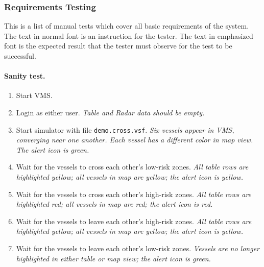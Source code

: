 \documentclass{article}
\begin{document}
\subsubsection{Requirements Testing}


This is a list of manual tests which cover all basic requirements of the system. The text in normal font is an instruction for the tester. The text in emphasized font is the expected result that the tester must observe for the test to be successful.

\paragraph{Sanity test.}

\begin{enumerate}
\item Start VMS.
\item Login as either user. \emph{Table and Radar data should be empty.}
\item Start simulator with file \verb|demo.cross.vsf|. \emph{Six vessels appear in VMS, converging near one another. Each vessel has a different color in map view. The alert icon is green.}
\item Wait for the vessels to cross each other's low-risk zones. \emph{All table rows are highlighted yellow; all vessels in map are yellow; the alert icon is yellow.}
\item Wait for the vessels to cross each other's high-risk zones. \emph{All table rows are highlighted red; all vessels in map are red; the alert icon is red.}
\item Wait for the vessels to leave each other's high-risk zones. \emph{All table rows are highlighted yellow; all vessels in map are yellow; the alert icon is yellow.}
\item Wait for the vessels to leave each other's low-risk zones. \emph{Vessels are no longer highlighted in either table or map view; the alert icon is green.}
\end{enumerate}
\end{document}
